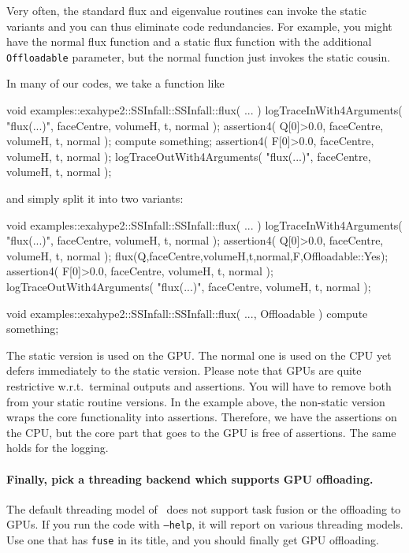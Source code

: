 \noindent
Very often, the standard flux and eigenvalue routines can invoke the
static variants and you can thus eliminate code redundancies.
For example, you might have the normal flux function and a static flux function
with the additional \texttt{Offloadable} parameter, but the 
normal function just invokes the static cousin.

In many of our codes, we take a function like
\begin{code}
void examples::exahype2::SSInfall::SSInfall::flux(
 ...
)  {
  logTraceInWith4Arguments( "flux(...)", faceCentre, volumeH, t, normal );
  assertion4( Q[0]>0.0, faceCentre, volumeH, t, normal );
  compute something;
  assertion4( F[0]>0.0, faceCentre, volumeH, t, normal );
  logTraceOutWith4Arguments( "flux(...)", faceCentre, volumeH, t, normal );
}
\end{code}

\noindent
and simply split it into two variants:
\begin{code}
void examples::exahype2::SSInfall::SSInfall::flux(
 ...
)  {
  logTraceInWith4Arguments( "flux(...)", faceCentre, volumeH, t, normal );
  assertion4( Q[0]>0.0, faceCentre, volumeH, t, normal );
  flux(Q,faceCentre,volumeH,t,normal,F,Offloadable::Yes);
  assertion4( F[0]>0.0, faceCentre, volumeH, t, normal );
  logTraceOutWith4Arguments( "flux(...)", faceCentre, volumeH, t, normal );
}


void examples::exahype2::SSInfall::SSInfall::flux(
  ...,
  Offloadable
)  {
  compute something;
}
\end{code}


\noindent
The static version is used on the GPU. 
The normal one is used on the CPU yet defers immediately to the static version.
Please note that GPUs are quite restrictive w.r.t.~terminal outputs and
assertions.
You will have to remove both from your static routine versions.
In the example above, the non-static version wraps the core functionality into
assertions. 
Therefore, we have the assertions on the CPU, but the core part that goes to the
GPU is free of assertions.
The same holds for the logging.


\paragraph{Finally, pick a threading backend which supports GPU offloading.}
%
%
%
The default threading model of \Peano\ does not support task fusion or the
offloading to GPUs. 
If you run the code with \texttt{--help}, it will report on various threading
models.
Use one that has \texttt{fuse} in its title, and you should finally get GPU
offloading.




